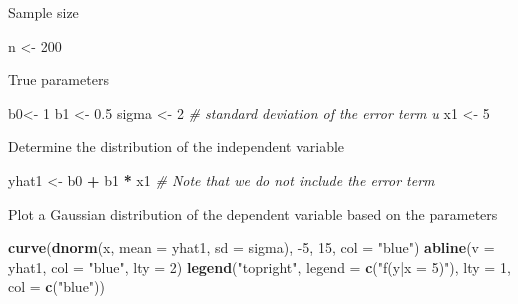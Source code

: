 \documentclass[]{book}
\newenvironment{Shaded}{\begin{snugshade}}{\end{snugshade}}
\newcommand{\CommentTok}[1]{\textcolor[rgb]{0.56,0.35,0.01}{\textit{#1}}}
\newcommand{\DataTypeTok}[1]{\textcolor[rgb]{0.13,0.29,0.53}{#1}}
\newcommand{\DecValTok}[1]{\textcolor[rgb]{0.00,0.00,0.81}{#1}}
\newcommand{\FloatTok}[1]{\textcolor[rgb]{0.00,0.00,0.81}{#1}}
\newcommand{\KeywordTok}[1]{\textcolor[rgb]{0.13,0.29,0.53}{\textbf{#1}}}
\newcommand{\NormalTok}[1]{#1}
\newcommand{\OperatorTok}[1]{\textcolor[rgb]{0.81,0.36,0.00}{\textbf{#1}}}
\newcommand{\StringTok}[1]{\textcolor[rgb]{0.31,0.60,0.02}{#1}}
\begin{document}
Sample size

\begin{Shaded}
\begin{Highlighting}[]
\NormalTok{n <-}\StringTok{ }\DecValTok{200}
\end{Highlighting}
\end{Shaded}

True parameters

\begin{Shaded}
\begin{Highlighting}[]
\NormalTok{b0<-}\StringTok{ }\DecValTok{1}
\NormalTok{b1 <-}\StringTok{ }\FloatTok{0.5}
\NormalTok{sigma <-}\StringTok{ }\DecValTok{2} \CommentTok{# standard deviation of the error term u }
\NormalTok{x1 <-}\StringTok{ }\DecValTok{5}
\end{Highlighting}
\end{Shaded}

Determine the distribution of the independent variable

\begin{Shaded}
\begin{Highlighting}[]
\NormalTok{yhat1 <-}\StringTok{ }\NormalTok{b0 }\OperatorTok{+}\StringTok{ }\NormalTok{b1 }\OperatorTok{*}\StringTok{ }\NormalTok{x1 }\CommentTok{#  Note that we do not include the error term }
\end{Highlighting}
\end{Shaded}

Plot a Gaussian distribution of the dependent variable based on the
parameters

\begin{Shaded}
\begin{Highlighting}[]
\KeywordTok{curve}\NormalTok{(}\KeywordTok{dnorm}\NormalTok{(x, }\DataTypeTok{mean =}\NormalTok{ yhat1, }\DataTypeTok{sd =}\NormalTok{ sigma), }\DecValTok{-5}\NormalTok{, }\DecValTok{15}\NormalTok{, }\DataTypeTok{col =} \StringTok{"blue"}\NormalTok{)}
\KeywordTok{abline}\NormalTok{(}\DataTypeTok{v =}\NormalTok{ yhat1, }\DataTypeTok{col =} \StringTok{"blue"}\NormalTok{, }\DataTypeTok{lty =} \DecValTok{2}\NormalTok{)}
\KeywordTok{legend}\NormalTok{(}\StringTok{"topright"}\NormalTok{, }\DataTypeTok{legend =} \KeywordTok{c}\NormalTok{(}\StringTok{"f(y|x = 5)"}\NormalTok{), }\DataTypeTok{lty =} \DecValTok{1}\NormalTok{, }\DataTypeTok{col =} \KeywordTok{c}\NormalTok{(}\StringTok{"blue"}\NormalTok{))}
\end{Highlighting}
\end{Shaded}
\end{document}
